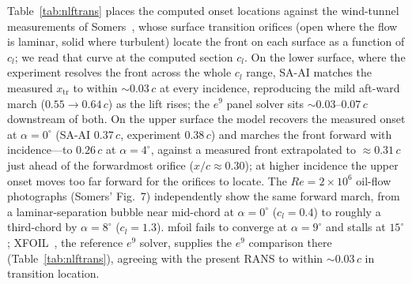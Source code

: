 \documentclass[journal]{new-aiaa}
\begin{document}
Table~\ref{tab:nlftrans} places the computed onset locations against the
wind-tunnel
measurements of Somers~\cite{somers_1981}, whose surface transition orifices
(open where the flow is laminar, solid where turbulent) locate the front on each
surface as a function of $c_l$; we read that curve at the computed section
$c_l$. On the lower surface, where the experiment resolves the front across the
whole $c_l$ range, SA-AI matches the measured $x_\mathrm{tr}$ to within
$\sim\!0.03\,c$ at every incidence, reproducing the mild aft-ward march
($0.55\!\to\!0.64\,c$) as the lift rises; the $e^9$ panel solver sits
$\sim\!0.03$--$0.07\,c$ downstream of both. On the upper surface the model
recovers the measured onset at $\alpha\!=\!0^\circ$
(SA-AI $0.37\,c$, experiment $0.38\,c$) and marches the front forward with
incidence---to $0.26\,c$ at $\alpha\!=\!4^\circ$, against a measured front
extrapolated to $\approx\!0.31\,c$ just ahead of the forwardmost orifice
($x/c\!\approx\!0.30$); at higher incidence the upper onset moves too far forward
for the orifices to locate. The $Re\!=\!2\!\times\!10^6$ oil-flow
photographs (Somers' Fig.~7) independently show the same forward march, from a
laminar-separation bubble near mid-chord at $\alpha\!=\!0^\circ$ ($c_l\!=\!0.4$)
to roughly a third-chord by $\alpha\!=\!8^\circ$ ($c_l\!=\!1.3$). mfoil fails to
converge at $\alpha\!=\!9^\circ$ and
stalls at $15^\circ$; XFOIL~\cite{drela_xfoil_1989}, the reference $e^9$ solver,
supplies the $e^9$ comparison there
(Table~\ref{tab:nlftrans}), agreeing with the present RANS
to within $\sim\!0.03\,c$ in transition location.
\end{document}
